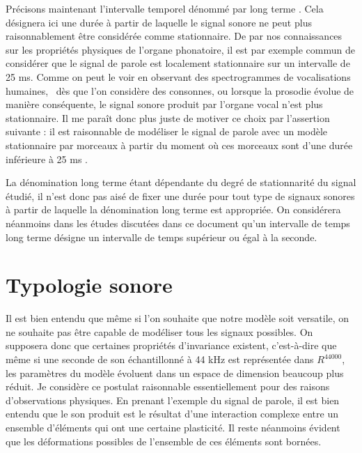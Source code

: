 Précisons maintenant l'intervalle temporel dénommé par \og long terme \fg. Cela désignera ici une durée à partir de laquelle le signal sonore ne peut plus raisonnablement être considérée comme stationnaire. De par nos connaissances sur les propriétés physiques de l'organe phonatoire, il est par exemple commun de considérer que le signal de parole est localement stationnaire sur un intervalle de 25 ms. Comme on peut le voir en observant des spectrogrammes de vocalisations humaines,~\cite{ladefoged2014course} dès que l'on considère des consonnes, ou lorsque la prosodie évolue de manière conséquente, le signal sonore produit par l'organe vocal n'est plus stationnaire. Il me paraît donc plus juste de motiver ce choix par l'assertion suivante : \og il est raisonnable de modéliser le signal de parole avec un modèle stationnaire par morceaux à partir du moment où ces morceaux sont d'une durée inférieure à 25 ms \fg.


La dénomination \og long terme \fg  étant dépendante du degré de stationnarité du signal étudié, il n'est donc pas aisé de fixer une durée pour tout type de signaux sonores à partir de laquelle la dénomination \og long terme \fg est appropriée. On considérera néanmoins dans les études discutées dans ce document qu'un intervalle de temps  \og long terme \fg désigne un intervalle de temps supérieur ou égal à la seconde.

\section{ \nmu Typologie sonore} \label{sec:typologie}

Il est bien entendu que même si l'on souhaite que notre modèle soit versatile, on ne souhaite pas être capable de modéliser tous les signaux possibles. On supposera donc que certaines propriétés d'invariance existent, c'est-à-dire que même si une seconde de son échantillonné à 44 kHz est représentée dans $R^{44000}$, les paramètres du modèle évoluent dans un espace de dimension beaucoup plus réduit. Je considère ce postulat raisonnable essentiellement pour des raisons d'observations physiques. En prenant l'exemple du signal de parole, il est bien entendu que le son produit est le résultat d'une interaction complexe entre un ensemble d'éléments qui ont une certaine plasticité. Il reste néanmoins évident que les déformations possibles de l'ensemble de ces éléments sont bornées.

